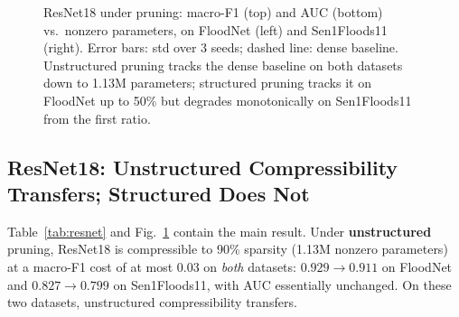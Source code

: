 \documentclass[conference]{IEEEtran}
\newif\ifreview
\newcommand{\REV}[1]{\ifreview\textcolor{red}{\textbf{[Revise: #1]}}\fi}
\begin{document}
\begin{figure}[t]
\caption{ResNet18 under pruning: macro-F1 (top) and AUC (bottom)
vs.\ nonzero parameters, on FloodNet (left) and Sen1Floods11 (right).
Error bars: std over 3 seeds; dashed line: dense baseline. Unstructured
pruning tracks the dense baseline on both datasets down to 1.13M
parameters; structured pruning tracks it on FloodNet up to 50\% but
degrades monotonically on Sen1Floods11 from the first ratio.}
\label{fig:curves}
\end{figure}
\REV{[A13] Figure: (i) the dense marker at 11.18M plus dashed line is
good; (ii) the main-text figure is hard to read in grayscale/print --
use different marker shapes \emph{and} line styles for structured vs.\
unstructured; (iii) consider plotting $\Delta$ macro-F1 vs.\ dense so
that the two datasets share one y-range -- the message (``same ratio,
different drop'') is then immediate; (iv) the x-axis issue from A11(b)
applies here: state ``masked/nonzero parameters''.}

\subsection{ResNet18: Unstructured Compressibility Transfers;
Structured Does Not}
Table~\ref{tab:resnet} and Fig.~\ref{fig:curves} contain the main
result. Under \textbf{unstructured} pruning, ResNet18 is compressible
to 90\% sparsity (1.13M nonzero parameters) at a macro-F1 cost of at
most $0.03$ on \emph{both} datasets: $0.929 \to 0.911$ on FloodNet and
$0.827 \to 0.799$ on Sen1Floods11, with AUC essentially unchanged. On
these two datasets, unstructured compressibility transfers.
\end{document}
